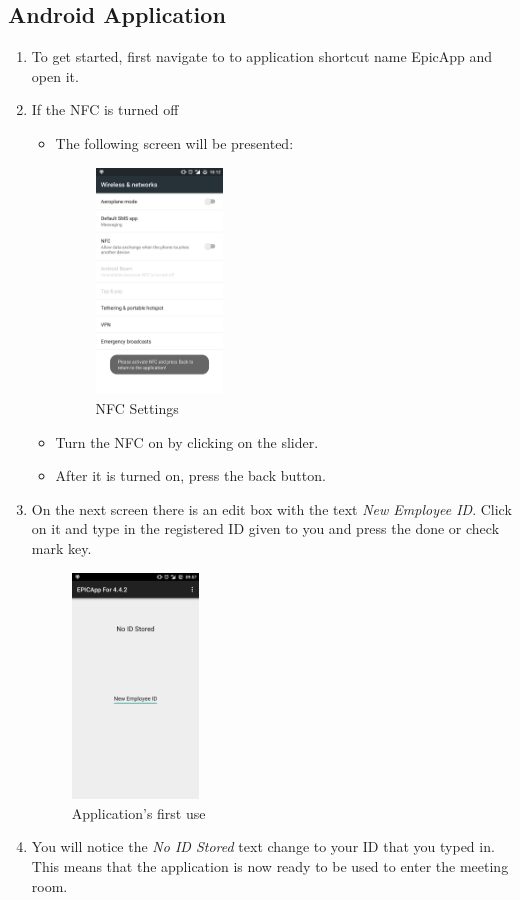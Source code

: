 \documentclass[a4paper,12pt,titlepage]{article}
\begin{document}
\subsection{Android Application}
\begin{enumerate}
\item To get started, first navigate to to application shortcut name EpicApp and open it.
\item If the NFC is turned off
\begin{itemize}
\item The following screen will be presented:
\begin{figure}[H]
\center
\includegraphics[height=6cm]{Settings}
\caption{NFC Settings}
\label{fig:my_label}
\end{figure}
\item Turn the NFC on by clicking on the slider.
\item After it is turned on, press the back button.
\end{itemize}

\item{ On the next screen there is an edit box with the text \textit{New Employee ID}. Click on it and type in the registered ID given to you and press the done or check mark key.
\begin{figure}[H]
\center
\includegraphics[height=6cm]{firstOpen}
\caption{Application's first use}
\label{fig:my_label2}
\end{figure}}
\item You will notice the \textit{No ID Stored} text change to your ID that you typed in. This means that the application is now ready to be used to enter the meeting room.
\end{enumerate}
\end{document}
